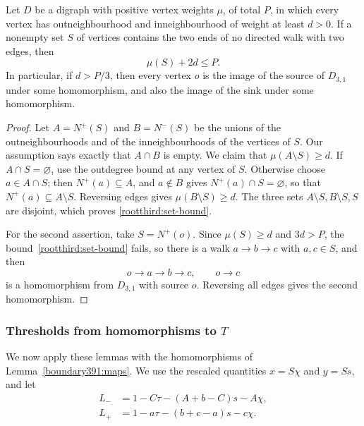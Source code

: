 \begin{lemma}
\label{rootthird:return}
Let $D$ be a digraph with positive vertex weights $\mu$, of
total $P$, in which every vertex has outneighbourhood and inneighbourhood of weight at least $d>0$.
If a nonempty set $S$ of vertices contains the two
ends of no directed walk with two edges, then
\begin{equation}\label{rootthird:set-bound}
 \mu(S)+2d\le P.
\end{equation}
In particular, if $d>P/3$, then every vertex $o$ is the image of the
source of $D_{3,1}$ under some homomorphism, and also the image of
the sink under some homomorphism.
\end{lemma}
\begin{proof}
Let $A=N^+(S)$ and $B=N^-(S)$ be the unions of the outneighbourhoods and of the inneighbourhoods of the vertices of $S$.
Our assumption says exactly that $A\cap B$
is empty. We claim that $\mu(A\setminus S)\ge d$.
If $A\cap S=\varnothing$, use the outdegree bound at any vertex
of $S$. Otherwise choose $a\in A\cap S$; then $N^+(a)\subseteq A$,
and $a\notin B$ gives $N^+(a)\cap S=\varnothing$, so that
$N^+(a)\subseteq A\setminus S$. Reversing edges gives
$\mu(B\setminus S)\ge d$. The three sets
$A\setminus S,B\setminus S,S$ are disjoint, which proves
\eqref{rootthird:set-bound}.

For the second assertion, take $S=N^+(o)$. Since $\mu(S)\ge d$ and $3d>P$, the bound~\eqref{rootthird:set-bound} fails,
so there is a walk $a\to b\to c$ with $a,c\in S$, and then
\[
 o\to a\to b\to c,
 \qquad o\to c
\]
is a homomorphism from $D_{3,1}$ with source $o$. Reversing all edges gives the second homomorphism.
\end{proof}


\subsubsection{Thresholds from homomorphisms to $T$}
We now apply these lemmas with the homomorphisms of Lemma~\ref{boundary391:maps}. We use the rescaled quantities $x=S\chi$ and $y=Ss$, and let
\begin{align}
 L_-&=1-C\tau-(A+b-C)s-A\chi,\label{tworoots:Lminus}\\
 L_+&=1-a\tau-(b+c-a)s-c\chi.\label{tworoots:Lplus}
\end{align}

